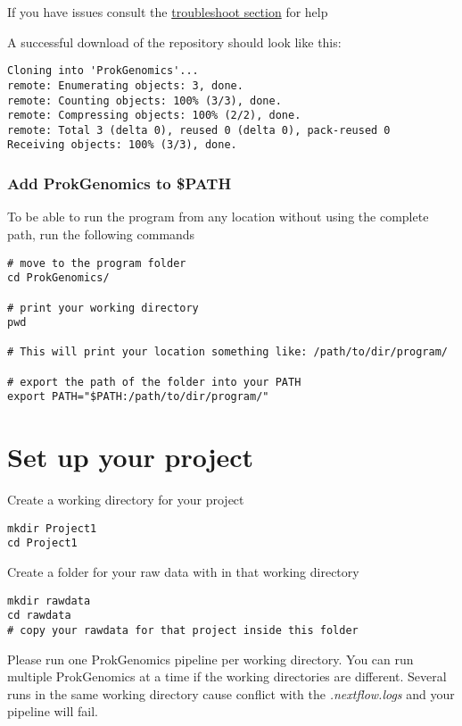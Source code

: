 \documentclass[
]{book}
\begin{document}
If you have issues consult the \href{troubleshooting.html}{troubleshoot section} for help

A successful download of the repository should look like this:

\begin{verbatim}
Cloning into 'ProkGenomics'...
remote: Enumerating objects: 3, done.
remote: Counting objects: 100% (3/3), done.
remote: Compressing objects: 100% (2/2), done.
remote: Total 3 (delta 0), reused 0 (delta 0), pack-reused 0
Receiving objects: 100% (3/3), done.
\end{verbatim}

\hypertarget{add-prokgenomics-to-path}{%
\subsection{Add ProkGenomics to \$PATH}\label{add-prokgenomics-to-path}}

To be able to run the program from any location without using the complete path, run the following commands

\begin{verbatim}
# move to the program folder
cd ProkGenomics/

# print your working directory
pwd 

# This will print your location something like: /path/to/dir/program/

# export the path of the folder into your PATH
export PATH="$PATH:/path/to/dir/program/"
\end{verbatim}

\hypertarget{set-up-your-project}{%
\chapter{Set up your project}\label{set-up-your-project}}

Create a working directory for your project

\begin{verbatim}
mkdir Project1
cd Project1
\end{verbatim}

Create a folder for your raw data with in that working directory

\begin{verbatim}
mkdir rawdata
cd rawdata
# copy your rawdata for that project inside this folder
\end{verbatim}

Please run one ProkGenomics pipeline per working directory. You can run multiple ProkGenomics at a time if the working directories are different. Several runs in the same working directory cause conflict with the \emph{.nextflow.logs} and your pipeline will fail.
\end{document}
